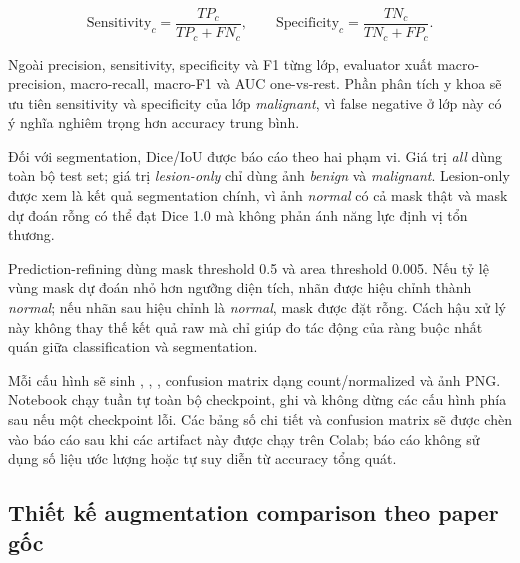 \documentclass[12pt,a4paper]{article}
\begin{document}
\[
\mathrm{Sensitivity}_c = \frac{TP_c}{TP_c+FN_c},
\qquad
\mathrm{Specificity}_c = \frac{TN_c}{TN_c+FP_c}.
\]

Ngoài precision, sensitivity, specificity và F1 từng lớp, evaluator xuất macro-precision, macro-recall, macro-F1 và AUC one-vs-rest. Phần phân tích y khoa sẽ ưu tiên sensitivity và specificity của lớp \textit{malignant}, vì false negative ở lớp này có ý nghĩa nghiêm trọng hơn accuracy trung bình.

Đối với segmentation, Dice/IoU được báo cáo theo hai phạm vi. Giá trị \textit{all} dùng toàn bộ test set; giá trị \textit{lesion-only} chỉ dùng ảnh \textit{benign} và \textit{malignant}. Lesion-only được xem là kết quả segmentation chính, vì ảnh \textit{normal} có cả mask thật và mask dự đoán rỗng có thể đạt Dice 1.0 mà không phản ánh năng lực định vị tổn thương.

Prediction-refining dùng mask threshold 0.5 và area threshold 0.005. Nếu tỷ lệ vùng mask dự đoán nhỏ hơn ngưỡng diện tích, nhãn được hiệu chỉnh thành \textit{normal}; nếu nhãn sau hiệu chỉnh là \textit{normal}, mask được đặt rỗng. Cách hậu xử lý này không thay thế kết quả raw mà chỉ giúp đo tác động của ràng buộc nhất quán giữa classification và segmentation.

Mỗi cấu hình sẽ sinh , , , confusion matrix dạng count/normalized và ảnh PNG. Notebook  chạy tuần tự toàn bộ checkpoint, ghi  và không dừng các cấu hình phía sau nếu một checkpoint lỗi. Các bảng số chi tiết và confusion matrix sẽ được chèn vào báo cáo sau khi các artifact này được chạy trên Colab; báo cáo không sử dụng số liệu ước lượng hoặc tự suy diễn từ accuracy tổng quát.


\subsection{Thiết kế augmentation comparison theo paper gốc}
\end{document}
